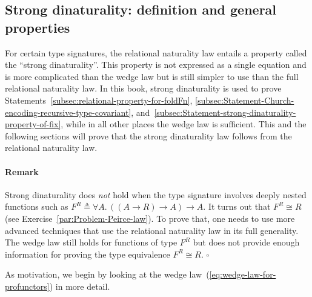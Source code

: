 \subsection{Strong dinaturality: definition and general properties\label{subsec:Strong-dinaturality.-General-properties}}

For certain type signatures, the relational naturality law entails
a property called the \textsf{``}strong dinaturality\textsf{''}. This property is
not expressed as a single equation and is more complicated than the
wedge law but is still simpler to use than the full relational naturality
law. In this book, strong dinaturality is used to prove Statements~\ref{subsec:relational-property-for-foldFn},
\ref{subsec:Statement-Church-encoding-recursive-type-covariant},
and~\ref{subsec:Statement-strong-dinaturality-property-of-fix},
while in all other places the wedge law is sufficient. This and the
following sections will prove that the strong dinaturality law follows
from the relational naturality law.

\paragraph{Remark}

Strong dinaturality does \emph{not} hold when the type signature involves
deeply nested functions such as $F^{R}\triangleq\forall A.\,(\left(A\rightarrow R\right)\rightarrow A)\rightarrow A$.
It turns out that $F^{R}\cong R$ (see Exercise~\ref{par:Problem-Peirce-law}).
To prove that, one needs to use more advanced techniques that use
the relational naturality law in its full generality. The wedge law
still holds for functions of type $F^{R}$ but does not provide enough
information for proving the type equivalence $F^{R}\cong R$. $\square$

As motivation, we begin by looking at the wedge law~(\ref{eq:wedge-law-for-profunctors})
in more detail.

